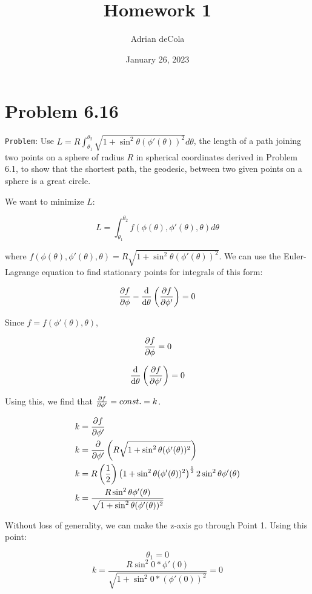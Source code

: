 \documentclass{article}
\title{Homework 1}
\author{Adrian deCola}
\date{January 26, 2023}
\begin{document}
\maketitle


\section*{Problem 6.16}
    \verb+Problem+: Use $L=R\int_{\theta_1}^{\theta_2}{\sqrt{1 + \sin^2{\theta}(\phi'(\theta))^2}d\theta}$, the length of a path joining two points on a sphere of radius $R$ in spherical coordinates derived in Problem 6.1, to show that the shortest path, the geodesic, between two given points on a sphere is a great circle. 
    \hline
         \ \ \ 

    We want to minimize $L$:
    
    $$L=\int_{\theta_1}^{\theta_2}{f(\phi(\theta), \phi'(\theta), \theta)d\theta}$$
    
    where $f(\phi(\theta), \phi'(\theta), \theta)=R\sqrt{1 + \sin^2{\theta}(\phi'(\theta))^2}$. We can use the Euler-Lagrange equation to find stationary points for integrals of this form:
    
    $$\pdv{f}{\phi} - \odv{}{\theta}\left( \pdv{f}{\phi'}\right)=0$$

    Since $f=f(\phi'(\theta), \theta)$, 

    $$\pdv{f}{\phi}=0$$

    $$\odv{}{\theta}\left( \pdv{f}{\phi'} \right) = 0$$

    Using this, we find that $\pdv{f}{\phi'}=const.=k$.
    
    \begin{align*}
        k &= \pdv{f}{\phi'}\\
        k &= \pdv{}{\phi'}\left( R\sqrt{1 + \sin^2{\theta}(\phi'(\theta))^2}\right)\\
        k &=  R\left( \frac{1}{2} \right) \left( 1 + \sin^2{\theta}(\phi'(\theta))^2 \right)^{\frac{1}{2}} 2\sin^2{\theta}\phi'(\theta)\\
        k &= \frac{R\sin^2{\theta}\phi'(\theta)}{\sqrt{1 + \sin^2{\theta}(\phi'(\theta))^2}}\\
    \end{align*}

    Without loss of generality, we can make the z-axis go through Point 1. Using this point:

    $$\theta_1 = 0$$
    $$k = \frac{R\sin^2{0}*\phi'(0)}{\sqrt{1 + \sin^2{0}*(\phi'(0))^2}}=0$$
\end{document}
